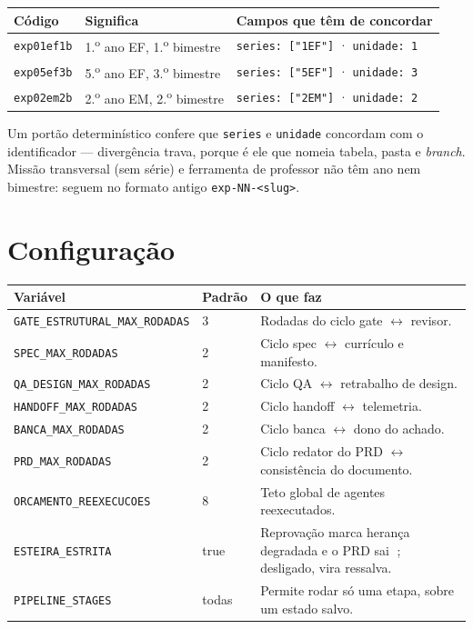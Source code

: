 \documentclass[11pt,a4paper]{article}
\newcommand{\cod}[1]{\texttt{\small #1}}
\begin{document}
\begin{center}
\begin{tabular}{lll}
\toprule
\textbf{Código} & \textbf{Significa} & \textbf{Campos que têm de concordar} \\
\midrule
\cod{exp01ef1b} & 1.\textsuperscript{o} ano EF, 1.\textsuperscript{o} bimestre & \cod{series: ["1EF"]} · \cod{unidade: 1} \\
\cod{exp05ef3b} & 5.\textsuperscript{o} ano EF, 3.\textsuperscript{o} bimestre & \cod{series: ["5EF"]} · \cod{unidade: 3} \\
\cod{exp02em2b} & 2.\textsuperscript{o} ano EM, 2.\textsuperscript{o} bimestre & \cod{series: ["2EM"]} · \cod{unidade: 2} \\
\bottomrule
\end{tabular}
\end{center}

\noindent
Um portão determinístico confere que \cod{series} e \cod{unidade} concordam com o
identificador --- divergência trava, porque é ele que nomeia tabela, pasta e \emph{branch}.
Missão transversal (sem série) e ferramenta de professor não têm ano nem bimestre: seguem no
formato antigo \cod{exp-NN-<slug>}.

\section{Configuração}

\begin{center}
\begin{tabular}{p{5.1cm}p{1.5cm}p{8.1cm}}
\toprule
\textbf{Variável} & \textbf{Padrão} & \textbf{O que faz} \\
\midrule
\cod{GATE\_ESTRUTURAL\_MAX\_RODADAS} & 3 & Rodadas do ciclo gate $\leftrightarrow$ revisor. \\
\cod{SPEC\_MAX\_RODADAS} & 2 & Ciclo spec $\leftrightarrow$ currículo e manifesto. \\
\cod{QA\_DESIGN\_MAX\_RODADAS} & 2 & Ciclo QA $\leftrightarrow$ retrabalho de design. \\
\cod{HANDOFF\_MAX\_RODADAS} & 2 & Ciclo handoff $\leftrightarrow$ telemetria. \\
\cod{BANCA\_MAX\_RODADAS} & 2 & Ciclo banca $\leftrightarrow$ dono do achado. \\
\cod{PRD\_MAX\_RODADAS} & 2 & Ciclo redator do PRD $\leftrightarrow$ consistência do documento. \\
\cod{ORCAMENTO\_REEXECUCOES} & 8 & Teto global de agentes reexecutados. \\
\cod{ESTEIRA\_ESTRITA} & true & Reprovação marca herança degradada e o PRD sai 🔴; desligado, vira ressalva. \\
\cod{PIPELINE\_STAGES} & todas & Permite rodar só uma etapa, sobre um estado salvo. \\
\bottomrule
\end{tabular}
\end{center}
\end{document}
